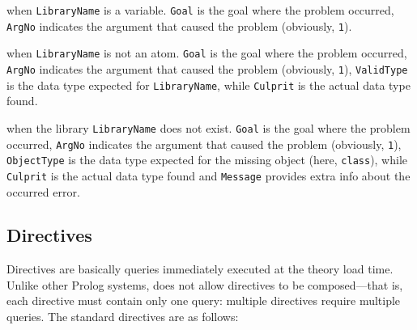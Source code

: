 \begin{itemize}

     when \texttt{LibraryName} is a variable. \texttt{Goal} is the goal where the problem occurred, \texttt{ArgNo} indicates the argument that caused the problem (obviously, \texttt{1}).

     when \texttt{LibraryName} is not an atom. \texttt{Goal} is the goal where the problem occurred, \texttt{ArgNo} indicates the argument that caused the problem (obviously, \texttt{1}), \texttt{ValidType} is the data type expected for \texttt{LibraryName}, while \texttt{Culprit} is the actual data type found.

     when the library \texttt{LibraryName} does not exist. \texttt{Goal} is the goal where the problem occurred, \texttt{ArgNo} indicates the argument that caused the problem (obviously, \texttt{1}), \texttt{ObjectType} is the data type expected for the missing object (here, \texttt{class}), while \texttt{Culprit} is the actual data type found and \texttt{Message} provides extra info about the occurred error.

\end{itemize}

\subsection{Directives}
\label{ssec:directives}

Directives are basically queries immediately executed at the theory load time.
%
Unlike other Prolog systems, \tuprolog{} does not allow directives to be composed---that is, each directive must contain only one query: multiple directives require multiple queries.
%
The standard directives are as follows:


